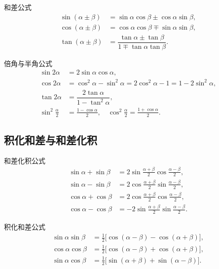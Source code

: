 \documentclass[a4paper,11pt]{ctexart}
\begin{document}
\begin{theorembox}{和差公式}
\begin{align*}
\sin(\alpha\pm\beta) &= \sin\alpha\cos\beta \pm \cos\alpha\sin\beta,\\
\cos(\alpha\pm\beta) &= \cos\alpha\cos\beta \mp \sin\alpha\sin\beta,\\
\tan(\alpha\pm\beta) &= \dfrac{\tan\alpha\pm\tan\beta}{1\mp\tan\alpha\tan\beta}.
\end{align*}
\end{theorembox}

\begin{theorembox}{倍角与半角公式}
\begin{align*}
\sin2\alpha &= 2\sin\alpha\cos\alpha,\\
\cos2\alpha &= \cos^2\alpha - \sin^2\alpha
            = 2\cos^2\alpha-1
            = 1-2\sin^2\alpha,\\
\tan2\alpha &= \dfrac{2\tan\alpha}{1-\tan^2\alpha},\\[0.3em]
\sin^2\frac{\alpha}{2} &= \frac{1-\cos\alpha}{2},\quad
\cos^2\frac{\alpha}{2} = \frac{1+\cos\alpha}{2}.
\end{align*}
\end{theorembox}

\subsection{积化和差与和差化积}

\begin{theorembox}{和差化积公式}
\begin{align*}
\sin\alpha + \sin\beta &= 2\sin\frac{\alpha+\beta}{2}\cos\frac{\alpha-\beta}{2},\\
\sin\alpha - \sin\beta &= 2\cos\frac{\alpha+\beta}{2}\sin\frac{\alpha-\beta}{2},\\
\cos\alpha + \cos\beta &= 2\cos\frac{\alpha+\beta}{2}\cos\frac{\alpha-\beta}{2},\\
\cos\alpha - \cos\beta &= -2\sin\frac{\alpha+\beta}{2}\sin\frac{\alpha-\beta}{2}.
\end{align*}
\end{theorembox}

\begin{theorembox}{积化和差公式}
\begin{align*}
\sin\alpha\sin\beta &= \frac{1}{2}\bigl[\cos(\alpha-\beta)-\cos(\alpha+\beta)\bigr],\\
\cos\alpha\cos\beta &= \frac{1}{2}\bigl[\cos(\alpha-\beta)+\cos(\alpha+\beta)\bigr],\\
\sin\alpha\cos\beta &= \frac{1}{2}\bigl[\sin(\alpha+\beta)+\sin(\alpha-\beta)\bigr].
\end{align*}
\end{theorembox}
\end{document}
